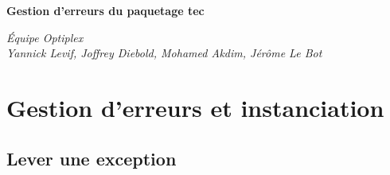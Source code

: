 \documentclass[11pt,a4paper]{article}
\begin{document}
\begin{center}
\huge{\textbf{Gestion d’erreurs du paquetage tec}}
\end{center}

\begin{flushleft}
\emph{\'Equipe Optiplex \\ Yannick Levif, Joffrey Diebold, Mohamed Akdim, Jérôme Le Bot}
\end{flushleft}
\section{Gestion d’erreurs et instanciation}
\subsection{Lever une exception}
\end{document}
